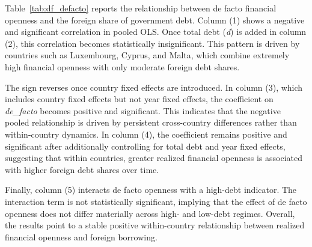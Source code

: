\documentclass[\latexroot/\projectname]{subfiles}
\begin{document}
Table~\ref{tab:df_defacto} reports the relationship between de facto financial openness and the foreign share of government debt. Column (1) shows a negative and significant correlation in pooled OLS. Once total debt (\textit{d}) is added in column (2), this correlation becomes statistically insignificant. This pattern is driven by countries such as Luxembourg, Cyprus, and Malta, which combine extremely high financial openness with only moderate foreign debt shares.

The sign reverses once country fixed effects are introduced. In column (3), which includes country fixed effects but not year fixed effects, the coefficient on \textit{de\_facto} becomes positive and significant. This indicates that the negative pooled relationship is driven by persistent cross-country differences rather than within-country dynamics. In column (4), the coefficient remains positive and significant after additionally controlling for total debt and year fixed effects, suggesting that within countries, greater realized financial openness is associated with higher foreign debt shares over time.

Finally, column (5) interacts de facto openness with a high-debt indicator. The interaction term is not statistically significant, implying that the effect of de facto openness does not differ materially across high- and low-debt regimes. Overall, the results point to a stable positive within-country relationship between realized financial openness and foreign borrowing.
\end{document}
